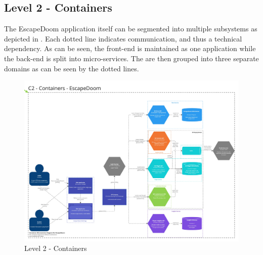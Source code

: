 \newpage

\subsection{Level 2 - Containers}\label{sub:5:l2}

The EscapeDoom application itself can be segmented into multiple subsystems as depicted in . Each dotted line indicates communication, and thus a technical dependency. As can be seen, the front-end is maintained as one application while the back-end is split into micro-services. The are then grouped into three separate domains as can be seen by the dotted lines.

\begin{figure}[h!tbp]
    \centering
    \includegraphics[width=0.9\linewidth]{images/C4/C2 - Containers.jpg}
    \caption{Level 2 - Containers}
    \label{fig:c4:c2}
\end{figure}

